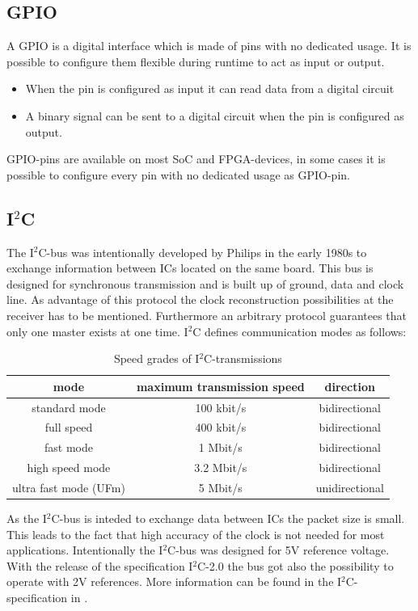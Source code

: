 \subsection{GPIO}
A GPIO is a digital interface which is made of pins with no dedicated usage. It is possible to configure them flexible during runtime to act as input or output.
\begin{itemize}
\item When the pin is configured as input it can read data from a digital circuit
\item A binary signal can be sent to a digital circuit when the pin is configured as output.
\end{itemize}
GPIO-pins are available on most SoC and FPGA-devices, in some cases it is possible to configure every pin with no dedicated usage as GPIO-pin.\cite{kernelgpio15}
\subsection{I$^2$C}
The I$^2$C-bus was intentionally developed by Philips in the early 1980s to exchange information between ICs located on the same board. This bus is designed for synchronous transmission and is built up of ground, data and clock line. As advantage of this protocol the clock reconstruction possibilities at the receiver has to be mentioned. Furthermore an arbitrary protocol guarantees that only one master exists at one time.\cite{Wue06} I$^2$C defines communication modes as follows:
\begin{table}
\begin{center}
\begin{tabular}{|c||c|c|}
\hline
mode & maximum transmission speed & direction\\
\hline\hline
standard mode & 100 kbit/s & bidirectional\\
\hline
full speed & 400 kbit/s & bidirectional\\
\hline
fast mode & 1 Mbit/s & bidirectional\\
\hline
high speed mode & 3.2 Mbit/s & bidirectional\\
\hline
ultra fast mode (UFm) & 5 Mbit/s & unidirectional\\
\hline
\end{tabular}
\caption{Speed grades of I$^2$C-transmissions\cite{I2Cspeed}}
\label{tab:rsstates}
\end{center}
\end{table}
As the I$^2$C-bus is inteded to exchange data between ICs the packet size is small. This leads to the fact that high accuracy of the clock is not needed for most applications.\cite{I2Cspeed} Intentionally the I$^2$C-bus was designed for 5V reference voltage. With the release of the specification I$^2$C-2.0 the bus got also the possibility to operate with 2V references.\cite{I2Cvoltage}
More information can be found in the I$^2$C-specification in \cite{I2Cspec}.

